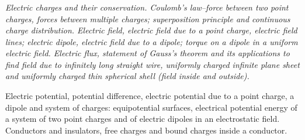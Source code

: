 \begin{frame}[t]
	\frametitle{}
	
	
	\noindent
	\begin{center}
	\end{center}
	
	\vspace{1em}
	
	\noindent
	\begin{minipage}[t]{\textwidth}
		\itshape\small
		Electric charges and their conservation. Coulomb’s law–force between two point charges, forces between multiple charges; superposition principle and continuous charge distribution. Electric field, electric field due to a point charge, electric field lines; electric dipole, electric field due to a dipole; torque on a dipole in a uniform electric field. Electric flux, statement of Gauss’s theorem and its applications to find field due to infinitely long straight wire, uniformly charged infinite plane sheet and uniformly charged thin spherical shell (field inside and outside).
		
		\vspace{0.5em}
		
		Electric potential, potential difference, electric potential due to a point charge, a dipole and system of charges: equipotential surfaces, electrical potential energy of a system of two point charges and of electric dipoles in an electrostatic field. Conductors and insulators, free charges and bound charges inside a conductor.
	\end{minipage}
	
\end{frame}

